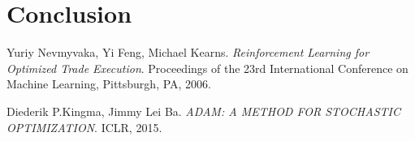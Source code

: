 \documentclass[12pt]{extarticle}
\begin{document}
\section{Conclusion}


\begin{thebibliography}{9}
Yuriy Nevmyvaka, Yi Feng, Michael Kearns.
\textit{Reinforcement Learning for Optimized Trade Execution}.
Proceedings of the 23rd International Conference on Machine Learning, Pittsburgh, PA, 2006.

Diederik P.Kingma, Jimmy Lei Ba.
\textit{ADAM: A METHOD FOR STOCHASTIC OPTIMIZATION}.
ICLR, 2015.
\end{thebibliography}
\end{document}
